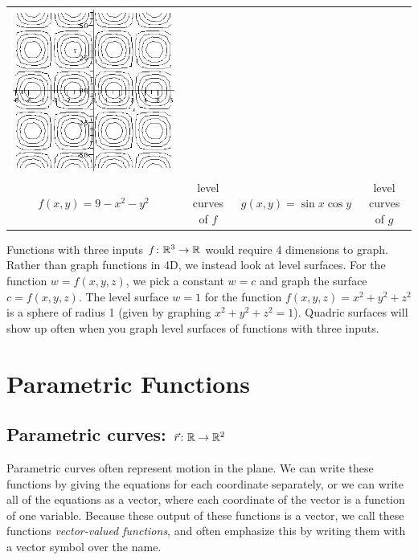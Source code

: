 \begin{center}
\begin{tabular}{cccc}
\includegraphics[width=\mywidth]{functions/functionseveral-4}
\\
$f(x,y)=9-x^2-y^2$&
level curves of $f$ &
$g(x,y) = \sin x \cos y$ &
level curves of $g$\end{tabular}
\end{center}

Functions with three inputs {$f\colon {\ensuremath{\mathbb{R}}}^3\to {\ensuremath{\mathbb{R}}}$} would require 4
dimensions to graph.  Rather than graph functions in 4D, we instead
look at level surfaces. For the function $w=f(x,y,z)$, we pick a
constant $w=c$ and graph the surface $c=f(x,y,z)$.  The level surface
$w=1$ for the function $f(x,y,z)=x^2+y^2+z^2$ is a sphere of radius 1
(given by graphing $x^2+y^2+z^2=1$).  Quadric surfaces will show up
often when you graph level surfaces of functions with three inputs.


\section{Parametric Functions}

\subsection{Parametric curves: {$\vec r\colon \mathbb{R}\to \mathbb{R}^2$}}
Parametric curves often represent motion in the plane.  We can write
these functions by giving the equations for each coordinate
separately, or we can write all of the equations as a vector, where
each coordinate of the vector is a function of one variable.  Because
these output of these functions is a vector, we call these functions
\emph{vector-valued functions}, and often emphasize this by writing
them with a vector symbol over the name.


